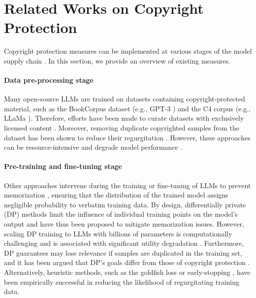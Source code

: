 \section{Related Works on Copyright Protection}
\label{sec:relatedwork}

Copyright protection measures can be implemented at various stages of the model supply chain \citep{lee2023talkin}. In this section, we provide an overview of existing measures.


\paragraph{Data pre-processing stage} Many open-source LLMs are trained on datasets containing copyright-protected material, such as the BookCorpus dataset (e.g., GPT-3 \citep{brown2020language}) and the C4 corpus (e.g., LLaMa \citep{touvron2023llama}). Therefore, efforts have been made to curate datasets with exclusively licensed content \citep{kocetkov2022stack, min2023silo, ippolito2023donottrain}. Moreover, removing duplicate copyrighted samples from the dataset has been shown to reduce their regurgitation \citep{lee2021deduplicating, kandpal2022deduplicating, carlini2023quantifying}. However, these approaches can be resource-intensive and degrade model performance \citep{ippolito2023preventing, Meeus2023DidTN}.


\paragraph{Pre-training and fine-tuning stage} Other approaches intervene during the training or fine-tuning of LLMs to prevent memorization \citep{ carlini2023quantifying,zhang2023counterfactual,Somepalli2022DiffusionAO, mm_mem2024}, ensuring that the distribution of the trained model assigns negligible probability to verbatim training data. By design, differentially private (DP) methods \citep{dwork2014algorithmic, abadi2016deep} limit the influence of individual training points on the model's output and have thus been proposed to mitigate memorization issues. However, scaling DP training to LLMs with billions of parameters is computationally challenging and is associated with significant utility degradation \citep{anil2022large}. Furthermore, DP guarantees may lose relevance if samples are duplicated in the training set, and it has been argued that DP's goals differ from those of copyright protection \citep{elkin2023can}. Alternatively, heuristic methods, such as the goldfish loss \citep{hans2024like} or early-stopping \citep{mireshghallah2022memorization,zhang2023counterfactual,mm_mem2024}, have been empirically successful in reducing the likelihood of regurgitating training data.



